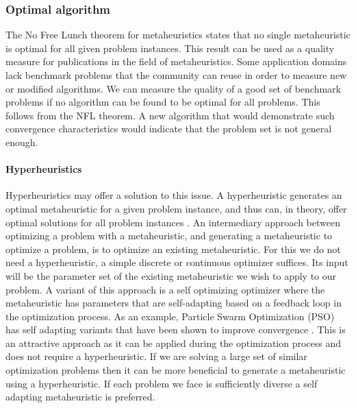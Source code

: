\subsubsection{Optimal algorithm}
The No Free Lunch theorem for metaheuristics \cite{NFL} states that no single metaheuristic is optimal for all given problem instances. 
This result can be used as a quality measure for publications in the field of metaheuristics. Some application domains lack benchmark problems that the community can reuse in order to measure new or modified algorithms. 
We can measure the quality of a good set of benchmark problems if no algorithm can be found to be optimal for all problems. This follows from the NFL theorem. A new algorithm that would demonstrate such convergence characteristics would indicate that the problem set is not general enough.

\paragraph{Hyperheuristics}
Hyperheuristics may offer a solution to this issue. A hyperheuristic generates an optimal metaheuristic for a given problem instance, and thus can, in theory, offer optimal solutions for all problem instances \cite{HyperNFL}.
An intermediary approach between optimizing a problem with a metaheuristic, and generating a metaheuristic to optimize a problem, is to optimize an existing metaheuristic. For this we do not need a hyperheuristic, a simple discrete or continuous optimizer suffices. Its input will be the parameter set of the existing metaheuristic we wish to apply to our problem. A variant of this approach is a self optimizing optimizer where the metaheuristic has parameters that are self-adapting based on a feedback loop in the optimization process. As an example, Particle Swarm Optimization (PSO) \cite{PSO} has self adapting variants that have been shown to improve convergence \cite{PSOInertiaShi}. This is an attractive approach as it can be applied during the optimization process and does not require a hyperheuristic. If we are solving a large set of similar optimization problems then it can be more beneficial to generate a metaheuristic using a hyperheuristic. If each problem we face is sufficiently diverse a self adapting metaheuristic is preferred. 

